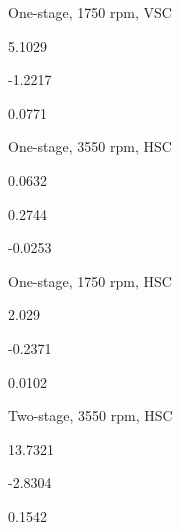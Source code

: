 \documentclass[a4paper,portrait,12pt]{article}
\begin{document}
\begin{flushleft}
One-stage, 1750 rpm, VSC
\end{flushleft}





5.1029





-1.2217





0.0771





\begin{flushleft}
One-stage, 3550 rpm, HSC
\end{flushleft}





0.0632





0.2744





-0.0253





\begin{flushleft}
One-stage, 1750 rpm, HSC
\end{flushleft}





2.029





-0.2371





0.0102





\begin{flushleft}
Two-stage, 3550 rpm, HSC
\end{flushleft}





13.7321





-2.8304





0.1542
\end{document}

